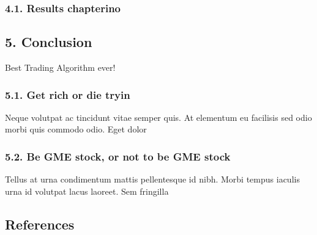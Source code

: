 \documentclass[
]{article}
\begin{document}
\hypertarget{results-chapterino}{%
\subsubsection{4.1. Results chapterino}\label{results-chapterino}}

\newpage

\hypertarget{conclusion}{%
\subsection{5. Conclusion}\label{conclusion}}

Best Trading Algorithm ever!

\hypertarget{get-rich-or-die-tryin}{%
\subsubsection{5.1. Get rich or die tryin}\label{get-rich-or-die-tryin}}

Neque volutpat ac tincidunt vitae semper quis. At elementum eu facilisis
sed odio morbi quis commodo odio. Eget dolor

\hypertarget{be-gme-stock-or-not-to-be-gme-stock}{%
\subsubsection{5.2. Be GME stock, or not to be GME
stock}\label{be-gme-stock-or-not-to-be-gme-stock}}

Tellus at urna condimentum mattis pellentesque id nibh. Morbi tempus
iaculis urna id volutpat lacus laoreet. Sem fringilla

\newpage

\hypertarget{references}{%
\subsection{References}\label{references}}
\end{document}

